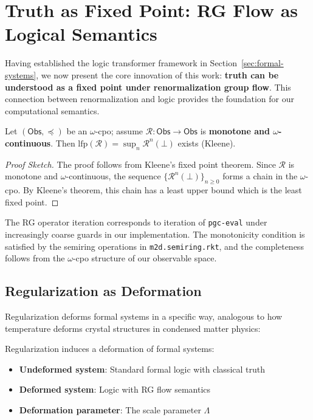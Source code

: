 \section{Truth as Fixed Point: RG Flow as Logical Semantics}
\label{sec:truth-fixed-point}

Having established the logic transformer framework in Section~\ref{sec:formal-systems}, we now present the core innovation of this work: \textbf{truth can be understood as a fixed point under renormalization group flow}. This connection between renormalization and logic provides the foundation for our computational semantics.

\begin{theorem}
\label{thm:truth-fixed-point}
Let $(\mathsf{Obs},\preceq)$ be an $\omega$-cpo; assume $\mathcal{R}:\mathsf{Obs}\to\mathsf{Obs}$ is \textbf{monotone and $\omega$-continuous}. Then $\mathrm{lfp}(\mathcal{R})=\sup_n \mathcal{R}^n(\bot)$ exists (Kleene).
\end{theorem}

\begin{proof}[Proof Sketch]
The proof follows from Kleene's fixed point theorem. Since $\mathcal{R}$ is monotone and $\omega$-continuous, the sequence $\{\mathcal{R}^n(\bot)\}_{n \geq 0}$ forms a chain in the $\omega$-cpo. By Kleene's theorem, this chain has a least upper bound which is the least fixed point.
\end{proof}

\begin{remark}
\label{rem:implementation-connection}
The RG operator iteration corresponds to iteration of \texttt{pgc-eval} under increasingly coarse guards in our implementation. The monotonicity condition is satisfied by the semiring operations in \texttt{m2d.semiring.rkt}, and the completeness follows from the $\omega$-cpo structure of our observable space.
\end{remark}

\subsection{Regularization as Deformation}

Regularization deforms formal systems in a specific way, analogous to how temperature deforms crystal structures in condensed matter physics:

\begin{definition}
Regularization induces a deformation of formal systems:
\begin{itemize}
\item \textbf{Undeformed system}: Standard formal logic with classical truth
\item \textbf{Deformed system}: Logic with RG flow semantics
\item \textbf{Deformation parameter}: The scale parameter $\Lambda$
\end{itemize}
\end{definition}

